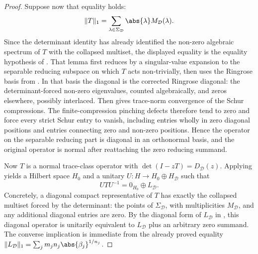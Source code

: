 \begin{proof}
  Suppose now that equality holds:
  \[
    \|T\|_1
    =\sum_{\lambda\in\Sigma_{\mathcal D}}
      \abs{\lambda}M_{\mathcal D}(\lambda).
  \]
  Since the determinant identity has already identified the non-zero algebraic
  spectrum of \(T\) with the collapsed multiset, the displayed equality is the
  equality hypothesis of
  .  That lemma first
  reduces by a singular-value expansion to the separable reducing subspace on
  which \(T\) acts non-trivially, then uses the Ringrose basis from
  .  In that basis the diagonal is the
  corrected Ringrose diagonal: the determinant-forced non-zero eigenvalues,
  counted algebraically, and zeros elsewhere, possibly interlaced.  Then
   gives trace-norm convergence of the
  Schur compressions.  The finite-compression pinching defects therefore tend
  to zero and force every strict Schur entry to vanish, including entries wholly
  in zero diagonal positions and entries connecting zero and non-zero positions.
  Hence the operator on the
  separable reducing part is diagonal in an orthonormal basis, and the original
  operator is normal after reattaching the zero reducing summand.

  Now \(T\) is a normal trace-class operator with
  \(\det(I-zT)=D_{\mathcal D}(z)\). Applying
   yields a Hilbert space \(H_0\)
  and a unitary \(U:H\to H_0\oplus H_{\mathcal D}\) such that
  \[
    UTU^{-1}=0_{H_0}\oplus L_{\mathcal D}.
  \]
  Concretely, a diagonal compact representative of \(T\) has exactly the
  collapsed multiset forced by the determinant: the points of
  \(\Sigma_{\mathcal D}\), with multiplicities \(M_{\mathcal D}\), and any
  additional diagonal entries are zero.  By the diagonal form of
  \(L_{\mathcal D}\) in
  , this diagonal operator is
  unitarily equivalent to \(L_{\mathcal D}\) plus an arbitrary zero summand.
  The converse implication is immediate from the already proved equality
  \(\|L_{\mathcal D}\|_1=\sum_jm_jn_j\abs{\beta_j}^{1/n_j}\).
\end{proof}

